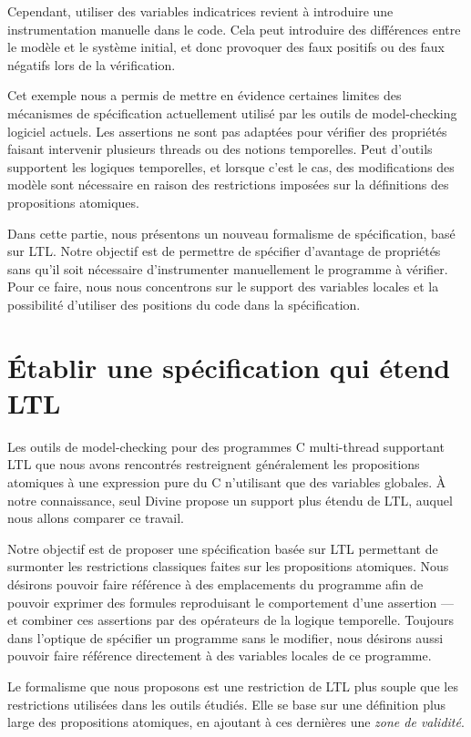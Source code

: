 Cependant, utiliser des variables indicatrices revient à introduire une
instrumentation manuelle dans le code. Cela peut introduire des
différences entre le modèle et le système initial, et donc provoquer des
faux positifs ou des faux négatifs lors de la vérification.

Cet exemple nous a permis de mettre en évidence certaines limites des mécanismes
de spécification actuellement utilisé par les outils de model-checking logiciel
actuels. Les assertions ne sont pas adaptées pour vérifier des propriétés
faisant intervenir plusieurs threads ou des notions temporelles. Peut d'outils
supportent les logiques temporelles, et lorsque c'est le cas, des modifications
des modèle sont nécessaire en raison des restrictions imposées sur la
définitions des propositions atomiques.

Dans cette partie, nous présentons un nouveau formalisme de spécification, basé
sur LTL. Notre objectif est de permettre de spécifier d'avantage de propriétés
sans qu'il soit nécessaire d'instrumenter manuellement le programme à vérifier.
Pour ce faire, nous nous concentrons sur le support des variables locales et la
possibilité d'utiliser des positions du code dans la spécification.

\section{Établir une spécification qui étend LTL}

Les outils de model-checking pour des programmes C multi-thread
supportant LTL que nous avons rencontrés restreignent généralement les
propositions atomiques à une expression pure du C n'utilisant que des
variables globales. À notre connaissance, seul
Divine\cite{Divine_LTL} propose un support plus étendu de LTL,
auquel nous allons comparer ce travail.

Notre objectif est de proposer une spécification basée sur LTL
permettant de surmonter les restrictions classiques faites sur les
propositions atomiques. Nous désirons pouvoir faire référence à des
emplacements du programme afin de pouvoir exprimer des formules
reproduisant le comportement d'une assertion --- et combiner ces
assertions par des opérateurs de la logique temporelle. Toujours dans
l'optique de spécifier un programme sans le modifier, nous désirons
aussi pouvoir faire référence directement à des variables locales de ce
programme.

Le formalisme que nous proposons est une restriction de LTL plus souple
que les restrictions utilisées dans les outils étudiés. Elle se base sur
une définition plus large des propositions atomiques, en ajoutant à ces
dernières une \emph{zone de validité}.

